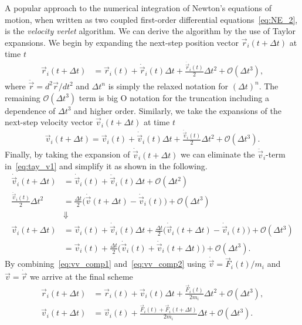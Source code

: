 A popular approach to the numerical integration of Newton's equations of motion, when written as two coupled first-order differential equations~\cref{eq:NE_2}, is the \textit{velocity verlet} algorithm. We can derive the algorithm by the use of Taylor expansions. We begin by expanding the next-step position vector $\vec{r}_i(t + \Delta t)$ at time $t$
\begin{align}
  \vec{r}_i(t + \Delta t) &= \vec{r}_i(t) + \dot{\vec{r}}_i(t) \Delta t + \frac{\ddot{\vec{r}}_i(t)}{2} \Delta t^2 + \mathcal{O}(\Delta t^3) \label{eq:vv_comp1},
\end{align}
where $\ddot{\vec{r}} = d^2\vec{r}/dt^2$ and $\Delta t^n$ is simply the relaxed
notation for $(\Delta t)^n$. The remaining $\mathcal{O}(\Delta t^3)$ term is big O notation for the truncation including a dependence of $\Delta t^3$ and higher order. Similarly, we take the expansions of the next-step
velocity vector $\vec{v}_i(t+\Delta t)$ at time $t$ 
\begin{align}
  \vec{v}_i(t+\Delta t) = \vec{v}_i(t) + \dot{\vec{v}}_i(t) \Delta t + \frac{\ddot{\vec{v}}_i(t)}{2}\Delta t^2 + \mathcal{O}(\Delta t^3).
  \label{eq:tay_v1}
\end{align}
Finally, by taking the expansion of $\dot{\vec{v}}_i(t+\Delta t)$ we can
eliminate the $\ddot{\vec{v}}_i$-term in~\cref{eq:tay_v1} and simplify it as
shown in the following.
\begin{align}
  \dot{\vec{v}}_i(t+\Delta t) &= \dot{\vec{v}}_i(t) + \ddot{\vec{v}}_i(t) \Delta t + \mathcal{O}(\Delta t^2) \nonumber \\
  \frac{\ddot{\vec{v}}_i(t)}{2}\Delta t^2 &= \frac{\Delta t}{2}\Big( \dot{\vec{v}}(t+\Delta t) - \dot{\vec{v}}_i(t)\Big) + \mathcal{O}(\Delta t^3) \nonumber \\
  &\Downarrow \nonumber \\
  \vec{v}_i(t+\Delta t) &= \vec{v}_i(t) + \dot{\vec{v}}_i(t) \Delta t + \frac{\Delta t}{2}\Big( \dot{\vec{v}}_i(t+\Delta t) - \dot{\vec{v}}_i(t)\Big) + \mathcal{O}(\Delta t^3) \nonumber \\
  &=  \vec{v}_i(t) + \frac{\Delta t}{2}\Big( \dot{\vec{v}}_i(t) +  \dot{\vec{v}}_i(t+\Delta t)\Big) + \mathcal{O}(\Delta t^3).
  \label{eq:vv_comp2}
\end{align}
By combining~\cref{eq:vv_comp1} and~\cref{eq:vv_comp2} using $\dot{\vec{v}} = \vec{F}_i(t)/m_i$ and $\vec{v} = \dot{\vec{r}}$ we
arrive at the final scheme
\begin{align*}
  \vec{r}_i(t + \Delta t) &= \vec{r}_i(t) + \vec{v}_i(t) \Delta t + \frac{\vec{F}_i(t)}{2m_i}\Delta t^2 + \mathcal{O}(\Delta t^3), \\
  \vec{v}_i(t+\Delta t)  &= \vec{v}_i(t) + \frac{\vec{F}_i(t) + \vec{F}_i(t+\Delta t)}{2m_i}  \Delta t + \mathcal{O}(\Delta t^3).
\end{align*}
